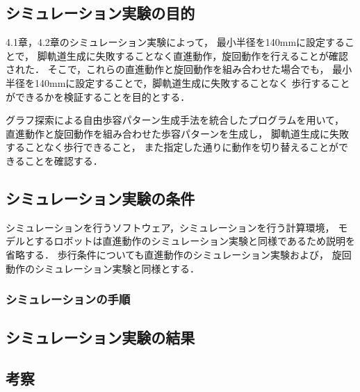 
\subsection{シミュレーション実験の目的}
4.1章，4.2章のシミュレーション実験によって，
最小半径を140mmに設定することで，
脚軌道生成に失敗することなく直進動作，旋回動作を行えることが確認された．
そこで，これらの直進動作と旋回動作を組み合わせた場合でも，
最小半径を140mmに設定することで，脚軌道生成に失敗することなく
歩行することができるかを検証することを目的とする．

グラフ探索による自由歩容パターン生成手法を統合したプログラムを用いて，
直進動作と旋回動作を組み合わせた歩容パターンを生成し，
脚軌道生成に失敗することなく歩行できること，
また指定した通りに動作を切り替えることができることを確認する．

\subsection{シミュレーション実験の条件}
シミュレーションを行うソフトウェア，シミュレーションを行う計算環境，
モデルとするロボットは直進動作のシミュレーション実験と同様であるため説明を省略する．
歩行条件についても直進動作のシミュレーション実験および，
旋回動作のシミュレーション実験と同様とする．

\subsubsection{シミュレーションの手順}


\subsection{シミュレーション実験の結果}

\subsection{考察}
